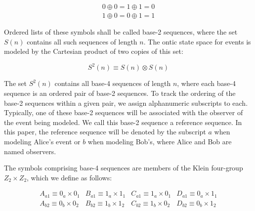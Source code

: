 \documentclass{article}
\begin{document}
 \begin{equation}
     \begin{array}{cc}
        0\oplus0=1\oplus1=0\\
        1\oplus0=0\oplus1=1 
     \end{array}
 \end{equation}
 
 Ordered lists of these symbols shall be called base-2 sequences, where the set $S(n)$ contains all such sequences of length $n$. The ontic state space for events is modeled by the Cartesian product of two copies of this set:

\begin{equation}
    S^2(n)\equiv S(n)\otimes S(n)
    \label{eq: base-4 set}
\end{equation}

The set $S^2(n)$ contains all base-4 sequences of length $n$, where each base-4 sequence is an ordered pair of base-2 sequences. To track the ordering of the base-2 sequences within a given pair, we assign alphanumeric subscripts to each. Typically, one of these base-2 sequences will be associated with the observer of the event being modeled. We call this base-2 sequence a reference sequence. In this paper, the reference sequence will be denoted by the subscript $a$ when modeling Alice's event or $b$ when modeling Bob's, where Alice and Bob are named observers.

The symbols comprising base-4 sequences are members of the Klein four-group $Z_{2}\times Z_{2}$, which we define as follows:

\begin{equation}
\begin{array}{c}
    A_{a1}\equiv0_a\times0_1\\
    A_{b2}\equiv0_b\times0_2
\end{array}
\begin{array}{c}
    B_{a1}\equiv1_a\times1_1\\
    B_{b2}\equiv1_b\times1_2
\end{array}
\begin{array}{c}
    C_{a1}\equiv1_a\times0_1\\
    C_{b2}\equiv1_b\times0_2
\end{array}
\begin{array}{c}
    D_{a1}\equiv0_a\times1_1\\
    D_{b2}\equiv0_b\times1_2
\end{array}
\label{eq: base-4 symbols}
\end{equation}
\end{document}
